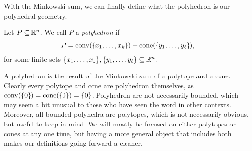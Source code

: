 \documentclass[12pt,oneside]{../../sfsuthesis}
\begin{document}
With the Minkowski sum, we can finally define what the polyhedron is our polyhedral geometry.
\begin{definition}[Polyhedron]\th\label{def:polyhedron}
    Let \( P \subseteq \mathbb{R}^n \). We call \( P \) a \emph{polyhedron} if
    \[
        P = \operatorname{conv}(\{x_1, \dots, x_k\}) + \mathrm{cone}(\{y_1, \dots, y_\ell\}),
    \]
    for some finite sets \( \{x_1, \dots, x_k\}, \{y_1, \dots, y_\ell\} \subseteq \mathbb{R}^n \).
\end{definition}
A polyhedron is the result of the Minkowski sum of a polytope and a cone.
Clearly every polytope and cone are polyhedron themselves, as \( \operatorname{conv}(\{0\}) = \mathrm{cone}(\{0\}) = \{ 0 \} \).
Polyhedron are not necessarily bounded, which may seem a bit unusual to those who have seen the word in other contexts.
Moreover, all bounded polyhedra are polytopes, which is not necessarily obvious, but useful to keep in mind.
We will mostly be focused on either polytopes or cones at any one time, but having a more general object that includes both makes our definitions going forward a cleaner.
\end{document}
